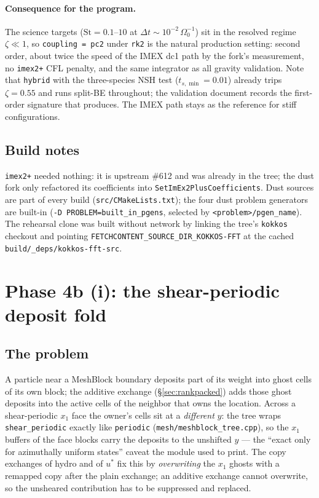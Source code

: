 \documentclass[11pt]{article}
\newcommand{\code}[1]{\texttt{#1}}
\newcommand{\file}[1]{\texttt{\small #1}}
\newcommand{\fn}[1]{\texttt{\small #1}}
\newcommand{\Om}{\Omega_0}
\begin{document}
\paragraph{Consequence for the program.} The science targets ($\mathrm{St} = 0.1$--$10$
at $\Delta t \sim 10^{-2}\,\Om^{-1}$) sit in the resolved regime $\zeta \ll 1$, so
\code{coupling = pc2} under \code{rk2} is the natural production setting: second
order, about twice the speed of the IMEX dc1 path by the fork's measurement, no
\code{imex2+} CFL penalty, and the same integrator as all gravity validation. Note
that \code{hybrid} with the three-species NSH test ($t_{s,\min} = 0.01$) already
trips $\zeta = 0.55$ and runs split-BE throughout; the validation document records
the first-order signature that produces. The IMEX path stays as the reference for
stiff configurations.

\subsection{Build notes}

\code{imex2+} needed nothing: it is upstream \#612 and was already in the tree; the
dust fork only refactored its coefficients into \fn{SetImEx2PlusCoefficients}. Dust
sources are part of every build (\file{src/CMakeLists.txt}); the four dust problem
generators are built-in (\code{-D PROBLEM=built\_in\_pgens}, selected by
\code{<problem>/pgen\_name}). The rehearsal clone was built without network by
linking the tree's \file{kokkos} checkout and pointing
\code{FETCHCONTENT\_SOURCE\_DIR\_KOKKOS-FFT} at the cached \file{build/\_deps/kokkos-fft-src}.

\section{Phase 4b (i): the shear-periodic deposit fold}
\label{sec:phase4b1}

\subsection{The problem}

A particle near a MeshBlock boundary deposits part of its weight into ghost cells of
its own block; the additive exchange (\S\ref{sec:rankpacked}) adds those ghost deposits
into the active cells of the neighbor that owns the location. Across a shear-periodic
$x_1$ face the owner's cells sit at a \emph{different} $y$: the tree wraps
\code{shear\_periodic} exactly like \code{periodic} (\file{mesh/meshblock\_tree.cpp}), so
the $x_1$ buffers of the face blocks carry the deposits to the unshifted $y$ --- the
``exact only for azimuthally uniform states'' caveat the module used to print. The copy
exchanges of hydro and of $u^\ast$ fix this by \emph{overwriting} the $x_1$ ghosts with
a remapped copy after the plain exchange; an additive exchange cannot overwrite, so the
unsheared contribution has to be suppressed and replaced.
\end{document}
